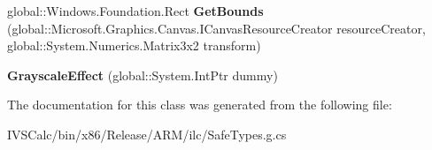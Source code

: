 \begin{DoxyCompactItemize}
\item 
\mbox{\label{class_microsoft_1_1_graphics_1_1_canvas_1_1_effects_1_1_grayscale_effect_a1d303822b3c4206b73165e84e42e55cd}} 
global\+::\+Windows.\+Foundation.\+Rect {\bfseries Get\+Bounds} (global\+::\+Microsoft.\+Graphics.\+Canvas.\+I\+Canvas\+Resource\+Creator resource\+Creator, global\+::\+System.\+Numerics.\+Matrix3x2 transform)
\item 
\mbox{\label{class_microsoft_1_1_graphics_1_1_canvas_1_1_effects_1_1_grayscale_effect_a015472d5b20c0e171a411c27f64edc01}} 
{\bfseries Grayscale\+Effect} (global\+::\+System.\+Int\+Ptr dummy)
\end{DoxyCompactItemize}


The documentation for this class was generated from the following file\+:\begin{DoxyCompactItemize}
\item 
I\+V\+S\+Calc/bin/x86/\+Release/\+A\+R\+M/ilc/Safe\+Types.\+g.\+cs\end{DoxyCompactItemize}
